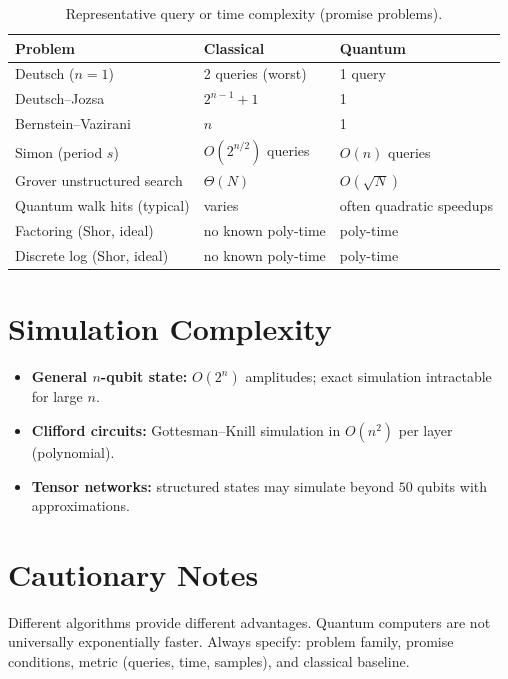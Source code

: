 \begin{table}[H]
\centering
\caption{Representative query or time complexity (promise problems).}
\label{tab:complexity-full}
\begin{tabular}{@{}lll@{}}
\toprule
Problem & Classical & Quantum \\
\midrule
Deutsch ($n=1$) & 2 queries (worst) & 1 query \\
Deutsch--Jozsa & $2^{n-1}+1$ & 1 \\
Bernstein--Vazirani & $n$ & 1 \\
Simon (period $s$) & $O(2^{n/2})$ queries & $O(n)$ queries \\
Grover unstructured search & $\Theta(N)$ & $O(\sqrt{N})$ \\
Quantum walk hits (typical) & varies & often quadratic speedups \\
Factoring (Shor, ideal) & no known poly-time & poly-time \\
Discrete log (Shor, ideal) & no known poly-time & poly-time \\
\bottomrule
\end{tabular}
\end{table}

\section{Simulation Complexity}

\begin{itemize}[noitemsep]
\item \textbf{General $n$-qubit state:} $O(2^n)$ amplitudes; exact simulation intractable for large $n$.
\item \textbf{Clifford circuits:} Gottesman--Knill simulation in $O(n^2)$ per layer (polynomial).
\item \textbf{Tensor networks:} structured states may simulate beyond $50$ qubits with approximations.
\end{itemize}

\section{Cautionary Notes}

Different algorithms provide different advantages. Quantum computers are not universally exponentially faster. Always specify: problem family, promise conditions, metric (queries, time, samples), and classical baseline.
